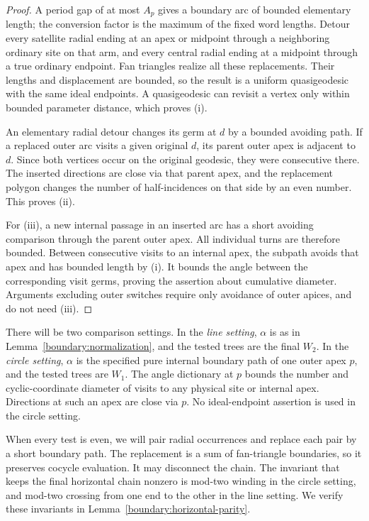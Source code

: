 \begin{proof}
A period gap of at most $A_p$ gives a boundary arc of bounded elementary
length; the conversion factor is the maximum of the fixed word lengths.
Detour every satellite radial ending at an apex or midpoint through a
neighboring ordinary site on that arm, and every central radial ending at
a midpoint through a true ordinary endpoint. Fan triangles realize all
these replacements. Their lengths and displacement are bounded, so the
result is a uniform quasigeodesic with the same ideal endpoints. A
quasigeodesic can revisit a vertex only within bounded parameter distance,
which proves (i).

An elementary radial detour changes its germ at $d$ by a bounded avoiding
path. If a replaced outer arc visits a given original $d$, its parent
outer apex is adjacent to $d$. Since both vertices occur on the original
geodesic, they were consecutive there. The inserted directions are close
via that parent apex, and the replacement polygon changes the number of
half-incidences on that side by an even number. This proves (ii).

For (iii), a new internal passage in an inserted arc has a short avoiding
comparison through the parent outer apex. All individual turns are
therefore bounded. Between consecutive visits to an internal apex, the
subpath avoids that apex and has bounded length by (i). It bounds the
angle between the corresponding visit germs, proving the assertion about
cumulative diameter. Arguments excluding outer switches require only
avoidance of outer apices, and do not need (iii).
\end{proof}

There will be two comparison settings. In the \emph{line setting},
$\alpha$ is as in Lemma~\ref{boundary:normalization}, and the tested trees
are the final $W_2$. In the \emph{circle setting}, $\alpha$ is the specified
pure internal boundary path of one outer apex $p$, and the tested trees are
$W_1$. The angle dictionary at $p$ bounds the number and cyclic-coordinate
diameter of visits to any physical site or internal apex. Directions at
such an apex are close via $p$. No ideal-endpoint assertion is used in the
circle setting.

When every test is even, we will pair radial occurrences and replace each
pair by a short boundary path. The replacement is a sum of fan-triangle
boundaries, so it preserves cocycle evaluation. It may disconnect the
chain. The invariant that keeps the final horizontal chain nonzero is
mod-two winding in the circle setting, and mod-two crossing from one end
to the other in the line setting. We verify these invariants in
Lemma~\ref{boundary:horizontal-parity}.

